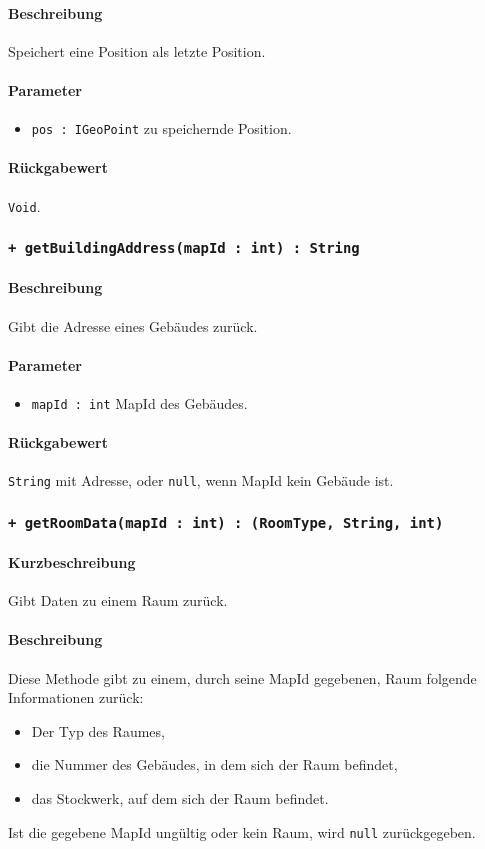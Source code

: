 \paragraph*{Beschreibung}
Speichert eine Position als letzte Position.
\paragraph*{Parameter}
\begin{itemize}
    \item \texttt{pos : IGeoPoint} zu speichernde Position.
\end{itemize}
\paragraph*{Rückgabewert}
\texttt{Void}.

\subsubsection*{\texttt{+ getBuildingAddress(mapId : int) : String}}%
\paragraph*{Beschreibung}
Gibt die Adresse eines Gebäudes zurück.
\paragraph*{Parameter}
\begin{itemize}
    \item \texttt{mapId : int} MapId des Gebäudes.
\end{itemize}
\paragraph*{Rückgabewert}
\texttt{String} mit Adresse, oder \texttt{null}, wenn MapId kein Gebäude ist.

\subsubsection*{\texttt{+ getRoomData(mapId : int) : (RoomType, String, int)}}%
\paragraph*{Kurzbeschreibung}
Gibt Daten zu einem Raum zurück.
\paragraph*{Beschreibung}
Diese Methode gibt zu einem, durch seine MapId gegebenen, Raum folgende Informationen zurück:
\begin{itemize}
    \item Der Typ des Raumes,
    \item die Nummer des Gebäudes, in dem sich der Raum befindet,
    \item das Stockwerk, auf dem sich der Raum befindet.
\end{itemize}
Ist die gegebene MapId ungültig oder kein Raum, wird \texttt{null} zurückgegeben.
